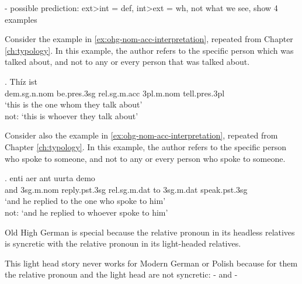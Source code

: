   - possible prediction: ext>int = def, int>ext = wh, not what we see, show 4 examples



Consider the example in \ref{ex:ohg-nom-acc-interpretation}, repeated from Chapter \ref{ch:typology}.
In this example, the author refers to the specific person which was talked about, and not to any or every person that was talked about.

\exg. Thíz ist   \\
\ac{dem}.\ac{sg}.\ac{n}.\ac{nom} be.\ac{pres}.3\ac{sg}\scsub{[nom]} \ac{rel}.\ac{sg}.\ac{m}.\ac{acc}
3\ac{pl}.\ac{m}.\ac{nom} tell.\ac{pres}.3\ac{pl}\scsub{[acc]}\\
`this is the one whom they talk about'\\
not: `this is whoever they talk about' \label{ex:ohg-nom-acc-interpretation}

Consider also the example in \ref{ex:ohg-nom-acc-interpretation}, repeated from Chapter \ref{ch:typology}.
In this example, the author refers to the specific person who spoke to someone, and not to any or every person who spoke to someone.

\exg. enti aer {ant uurta} demo  \\
and 3\ac{sg}.\ac{m}.\ac{nom} reply.\ac{pst}.3\ac{sg}\scsub{[dat]} \ac{rel}.\ac{sg}.\ac{m}.\ac{dat} {to 3\ac{sg}.\ac{m}.\ac{dat}} speak.\ac{pst}.3\ac{sg}\scsub{[nom]}\\
`and he replied to the one who spoke to him'\\
not: `and he replied to whoever spoke to him'
 \label{ex:ohg-dat-nom-rep}










 Old High German is special because the relative pronoun in its headless relatives is syncretic with the relative pronoun in its light-headed relatives.

 This light head story never works for Modern German or Polish because for them the relative pronoun and the light head are not syncretic: - and -


